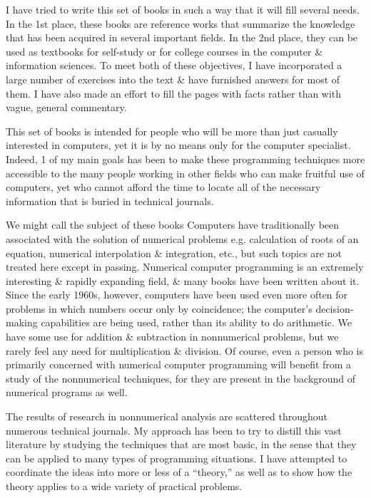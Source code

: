 \documentclass{article}
\begin{document}
I have tried to write this set of books in such a way that it will fill several needs. In the 1st place, these books are reference works that summarize the knowledge that has been acquired in several important fields. In the 2nd place, they can be used as textbooks for self-study or for college courses in the computer \& information sciences. To meet both of these objectives, I have incorporated a large number of exercises into the text \& have furnished answers for most of them. I have also made an effort to fill the pages with facts rather than with vague, general commentary.

This set of books is intended for people who will be more than just casually interested in computers, yet it is by no means only for the computer specialist. Indeed, 1 of my main goals has been to make these programming techniques more accessible to the many people working in other fields who can make fruitful use of computers, yet who cannot afford the time to locate all of the necessary information that is buried in technical journals.

We might call the subject of these books  Computers have traditionally been associated with the solution of numerical problems e.g. calculation of roots of an equation, numerical interpolation \& integration, etc., but such topics are not treated here except in passing. Numerical computer programming is an extremely interesting \& rapidly expanding field, \& many books have been written about it. Since the early 1960s, however, computers have been used even more often for problems in which numbers occur only by coincidence; the computer's decision-making capabilities are being used, rather than its ability to do arithmetic. We have some use for addition \& subtraction in nonnumerical problems, but we rarely feel any need for multiplication \& division. Of course, even a person who is primarily concerned with numerical computer programming will benefit from a study of the nonnumerical techniques, for they are present in the background of numerical programs as well.

The results of research in nonnumerical analysis are scattered throughout numerous technical journals. My approach has been to try to distill this vast literature by studying the techniques that are most basic, in the sense that they can be applied to many types of programming situations. I have attempted to coordinate the ideas into more or less of a ``theory,'' as well as to show how the theory applies to a wide variety of practical problems.
\end{document}
